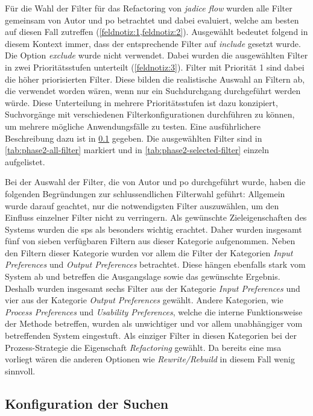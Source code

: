 Für die Wahl der Filter für das Refactoring von \emph{jadice flow} wurden alle Filter gemeinsam von Autor und \gls{po} betrachtet und dabei evaluiert, welche am besten auf diesen Fall zutreffen (\cref{feldnotiz:1,feldnotiz:2}).
Ausgewählt bedeutet folgend in diesem Kontext immer, dass der entsprechende Filter auf \emph{include} gesetzt wurde.
Die Option \emph{exclude} wurde nicht verwendet.
Dabei wurden die ausgewählten Filter in zwei Prioritätsstufen unterteilt (\cref{feldnotiz:3}).
Filter mit Priorität 1 sind dabei die höher priorisierten Filter.
Diese bilden die realistische Auswahl an Filtern ab, die verwendet worden wären, wenn nur ein Suchdurchgang durchgeführt werden würde.
Diese Unterteilung in mehrere Prioritätsstufen ist dazu konzipiert, Suchvorgänge mit verschiedenen Filterkonfigurationen durchführen zu können, um mehrere mögliche Anwendungsfälle zu testen.
Eine ausführlichere Beschreibung dazu ist in \cref{sec:phase2-suchconfig} gegeben.
Die ausgewählten Filter sind in \cref{tab:phase2-all-filter} markiert und in \cref{tab:phase2-selected-filter} einzeln aufgelistet.



Bei der Auswahl der Filter, die von Autor und \gls{po} durchgeführt wurde, haben die folgenden Begründungen zur schlussendlichen Filterwahl geführt:
Allgemein wurde darauf geachtet, nur die notwendigsten Filter auszuwählen, um den Einfluss einzelner Filter nicht zu verringern.
Als gewünschte Zieleigenschaften des Systems wurden die \glspl{sp} als besonders wichtig erachtet.
Daher wurden insgesamt fünf von sieben verfügbaren Filtern aus dieser Kategorie aufgenommen.
Neben den Filtern dieser Kategorie wurden vor allem die Filter der Kategorien \emph{Input Preferences} und \emph{Output Preferences} betrachtet.
Diese hängen ebenfalls stark vom System ab und betreffen die Ausgangslage sowie das gewünschte Ergebnis.
Deshalb wurden insgesamt sechs Filter aus der Kategorie \emph{Input Preferences} und vier aus der Kategorie \emph{Output Preferences} gewählt.
Andere Kategorien, wie \emph{Process Preferences} und \emph{Usability Preferences}, welche die interne Funktionsweise der Methode betreffen, wurden als unwichtiger und vor allem unabhängiger vom betreffenden System eingestuft.
Als einziger Filter in diesen Kategorien bei der Prozess-Strategie die Eigenschaft \emph{Refactoring} gewählt.
Da bereits eine \gls{msa} vorliegt wären die anderen Optionen wie \emph{Rewrite/Rebuild} in diesem Fall wenig sinnvoll.

\subsection{Konfiguration der Suchen}
\label{sec:phase2-suchconfig}

